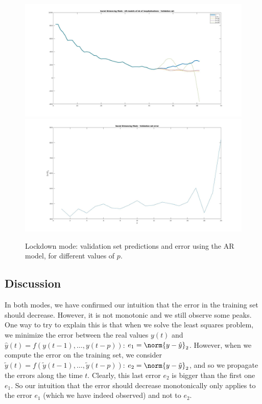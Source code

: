 \documentclass[11pt]{article}
\newcommand{\snorm}[1]{\norm{#1}_2} %
\begin{document}
\begin{figure}[h!]
\includegraphics[scale=0.25]{SD_val.jpg}
\includegraphics[scale=0.25]{SD_Err_Val.jpg}
\caption{Lockdown mode: validation set predictions and error using the AR model, for different values of \(p\).}
\label{fig:SD_val}
\end{figure}

\subsection*{Discussion}
In both modes, we have confirmed our intuition that the error in the training set should decrease. However, it is not monotonic and we still observe some peaks. One way to try to explain this is that when we solve the least squares problem, we minimize the error between the real values $y(t)$ and $\hat{y}(t) = f(y(t-1),\dots, y(t-p))$: $e_1 = \snorm{y-\hat{y}}$. However, when we compute the error on the training set, we consider $\tilde{y}(t) = f(\tilde{y}(t-1),\dots, \tilde{y}(t-p))$: $e_2 = \snorm{y-\tilde{y}}$, and so we propagate the errors along the time $t$. Clearly, this last error $e_2$ is bigger than the first one $e_1$. So our intuition that the error should decrease monotonically only applies to the error $e_1$ (which we have indeed observed) and not to $e_2$.
\end{document}
